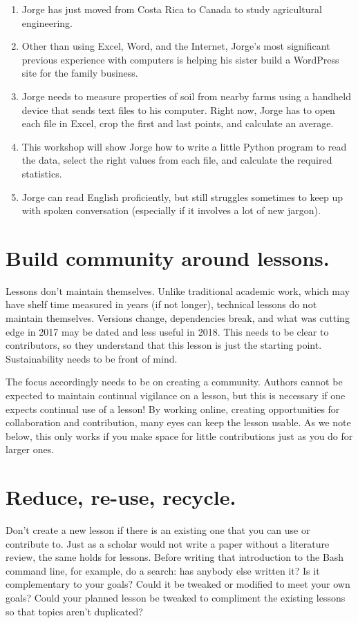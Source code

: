 \documentclass[10pt,letterpaper]{article}
\newcommand{\rulemajor}[1]{\section{#1}}
\begin{document}
\begin{enumerate}

\item
  Jorge has just moved from Costa Rica to Canada
  to study agricultural engineering.

\item
  Other than using Excel, Word, and the Internet,
  Jorge's most significant previous experience with computers is
  helping his sister build a WordPress site for the family business.

\item
  Jorge needs to measure properties of soil from nearby farms
  using a handheld device that sends text files to his computer.
  Right now, Jorge has to open each file in Excel,
  crop the first and last points,
  and calculate an average.

\item
  This workshop will show Jorge how to write a little Python program
  to read the data,
  select the right values from each file,
  and calculate the required statistics.

\item
  Jorge can read English proficiently,
  but still struggles sometimes to keep up with spoken conversation
  (especially if it involves a lot of new jargon).

\end{enumerate}

\rulemajor{Build community around lessons.}

Lessons don't maintain themselves.
Unlike traditional academic work,
which may have shelf time measured
in years (if not longer),
technical lessons do not maintain themselves.
Versions change, dependencies break,
and what was cutting edge in 2017 may be dated
and less useful in 2018.
This needs to be clear to contributors,
so they understand that this lesson is just
the starting point.
Sustainability needs to be front of mind.

The focus accordingly needs to be on creating a community.
Authors cannot be expected to maintain continual vigilance on a lesson,
but this is necessary if one expects continual use of a lesson!
By working online, creating opportunities for collaboration
and contribution, many eyes can keep the lesson usable.
As we note below,
this only works if you make space for
little contributions just as you do for larger ones.

\rulemajor{Reduce, re-use, recycle.}

Don't create a new lesson if there is an existing one that you can use or contribute to.
Just as a scholar would not write a paper without a literature review,
the same holds for lessons.
Before writing that introduction to the Bash command line,
for example,
do a search:
has anybody else written it?
Is it complementary to your goals?
Could it be tweaked or modified to meet your own goals?
Could your planned lesson be tweaked to compliment the existing lessons so that topics aren't duplicated?
\end{document}
